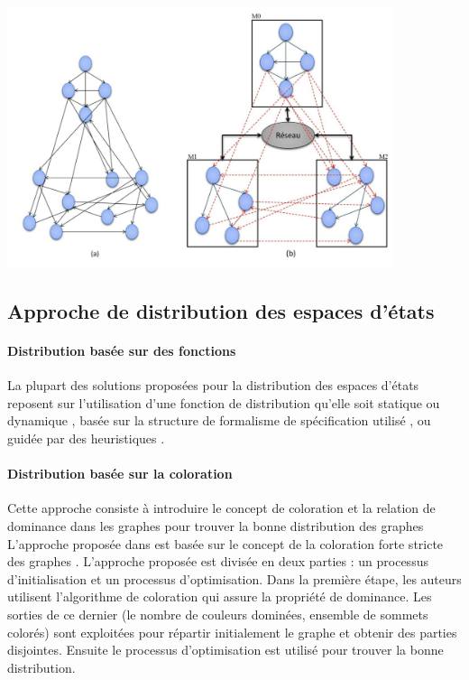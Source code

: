 \begin{center}
		\includegraphics[height=3in]{img/eed.PNG}		
		 \label{eed}
\end{center}

\subsection*{Approche de distribution des espaces d'états}
\paragraph{Distribution basée sur des fonctions}
 La plupart des solutions proposées pour la distribution des espaces d'états reposent sur l'utilisation d'une fonction de distribution qu'elle soit statique \citep{Garavel2013}ou dynamique \citep{Allmaier1997}, basée sur la structure de formalisme de spécification utilisé \citep{Ciardo1998}, \citep{BlomOrzan2005} ou guidée par des heuristiques \citep{Rodrigues2006}.
 \paragraph{Distribution basée sur la coloration}
 Cette approche consiste à introduire le concept de coloration et la relation de dominance dans les graphes pour trouver la bonne distribution des graphes L'approche proposée dans \citep{Guidoum2013} est basée sur le concept de la coloration forte stricte des graphes \citep{Bouzenada2012}. L'approche proposée est divisée en deux parties : un processus d'initialisation et un processus d'optimisation. Dans la première étape, les auteurs utilisent l'algorithme de coloration \citep{Bouzenada2012} qui assure la propriété de dominance. Les sorties de ce dernier (le nombre de couleurs dominées, ensemble de sommets colorés) sont exploitées pour répartir initialement le graphe et obtenir des parties disjointes. Ensuite le processus d'optimisation est utilisé pour trouver la bonne distribution.
 
